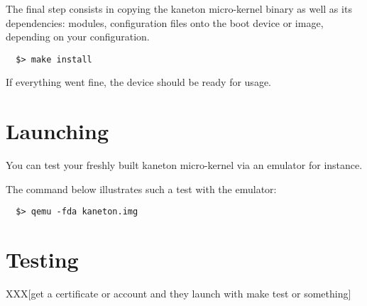 The final step consists in copying the kaneton micro-kernel binary as well as
its dependencies: modules, configuration files \etc{} onto the boot device
or image, depending on your configuration.

\begin{verbatim}
  $> make install
\end{verbatim}

If everything went fine, the device should be ready for usage.

%
%

\section{Launching}

You can test your freshly built kaneton micro-kernel via an emulator
for instance.

The command below illustrates such a test with the  emulator:

\begin{verbatim}
  $> qemu -fda kaneton.img
\end{verbatim}

%
%

\section{Testing}

XXX[get a certificate or account and they launch with make test or something]
